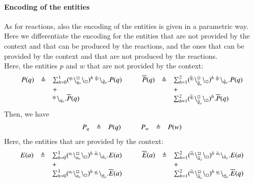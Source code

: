 \paragraph{Encoding of the entities}
As for reactions, also the encoding of the entities is given in a parametric way.
Here we differentiate the encoding for the entities that are not provided by the context and that can be produced by the reactions, and the ones that can be provided by the context and that are not produced by the reactions.\\
Here, the entities $p$ and $w$ that are not provided by the context:
\[
\begin{array}{lcl@{\hspace{1cm}}lcl}
P (q)&\defeq & \sum_{h=0}^1 (\startchain{q_i}\chainedlink{q_o}{\noact}\chainend{\noact})^h\ \link{\tilde{q}_i}{\tilde{q}_o}.P(q) &
\overline{P} (q)&\defeq & \sum_{h=1}^2 (\startchain{\overline{q}_i}\chainedlink{\overline{q}_o}{\noact}\chainend{\noact})^h\ \link{\tilde{q}_i}{\tilde{q}_o}.P(q)\\
&& + & && +\\
&& \link{q_i}{q_o}.\overline{P}(q) &
&& \sum_{h=1}^2 (\startchain{\overline{q}_i}\chainedlink{\overline{q}_o}{\noact}\chainend{\noact})^h.\overline{P}(q)\\
\end{array}
\]
Then, we have
\[
\begin{array}{lcl @{\hspace{1cm}}lcl}
P_q & \defeq & P(q) & P_w& \defeq & P(w)\\
\end{array}
\]
Here, the entities that are provided by the context:
\[
\begin{array}{lcl @{\hspace{1cm}}lcl}
E(a) & \defeq &  \sum_{h=0}^1 (\startchain{a_i}\chainedlink{a_o}{\noact}\chainend{\noact})^h\ \link{\hat{a}_i}{\hat{a}_o}.E(a) &  \overline{E} (a)&\defeq & \sum_{h=1}^2 (\startchain{\overline{a}_i}\chainedlink{\overline{a}_o}{\noact}\chainend{\noact})^h\ \link{\hat{a}_i}{\hat{a}_o}.E(a)\\
&& + &  && +\\
&& \sum_{h=0}^1 (\startchain{a_i}\chainedlink{a_o}{\noact}\chainend{\noact})^h\ \link{\underline{a}_i}{\underline{a}_o}.\overline{E}(a) &
&& \sum_{h=1}^2 (\startchain{\overline{a}_i}\chainedlink{\overline{a}_o}{\noact}\chainend{\noact})^h\ \link{\underline{a}_i}{\underline{a}_o}.\overline{E}(q)\\
\end{array}
\]
